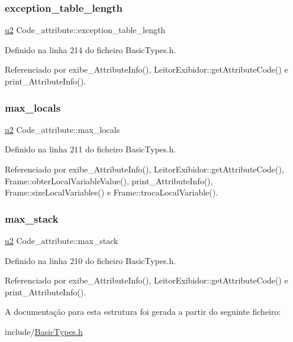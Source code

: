 \subsubsection{\texorpdfstring{exception\+\_\+table\+\_\+length}{exception\_table\_length}}
{\footnotesize\ttfamily \hyperlink{BasicTypes_8h_a732cde1300aafb73b0ea6c2558a7a54f}{u2} Code\+\_\+attribute\+::exception\+\_\+table\+\_\+length}



Definido na linha 214 do ficheiro Basic\+Types.\+h.



Referenciado por exibe\+\_\+\+Attribute\+Info(), Leitor\+Exibidor\+::get\+Attribute\+Code() e print\+\_\+\+Attribute\+Info().

\mbox{\label{structCode__attribute_ad710ec86a1d37c6daa999383f8f2fd35}} 
\subsubsection{\texorpdfstring{max\+\_\+locals}{max\_locals}}
{\footnotesize\ttfamily \hyperlink{BasicTypes_8h_a732cde1300aafb73b0ea6c2558a7a54f}{u2} Code\+\_\+attribute\+::max\+\_\+locals}



Definido na linha 211 do ficheiro Basic\+Types.\+h.



Referenciado por exibe\+\_\+\+Attribute\+Info(), Leitor\+Exibidor\+::get\+Attribute\+Code(), Frame\+::obter\+Local\+Variable\+Value(), print\+\_\+\+Attribute\+Info(), Frame\+::size\+Local\+Variables() e Frame\+::troca\+Local\+Variable().

\mbox{\label{structCode__attribute_a300885ff1326f01f7c86e7b4425f0d35}} 
\subsubsection{\texorpdfstring{max\+\_\+stack}{max\_stack}}
{\footnotesize\ttfamily \hyperlink{BasicTypes_8h_a732cde1300aafb73b0ea6c2558a7a54f}{u2} Code\+\_\+attribute\+::max\+\_\+stack}



Definido na linha 210 do ficheiro Basic\+Types.\+h.



Referenciado por exibe\+\_\+\+Attribute\+Info(), Leitor\+Exibidor\+::get\+Attribute\+Code() e print\+\_\+\+Attribute\+Info().



A documentação para esta estrutura foi gerada a partir do seguinte ficheiro\+:\begin{DoxyCompactItemize}
\item 
include/\hyperlink{BasicTypes_8h}{Basic\+Types.\+h}\end{DoxyCompactItemize}
